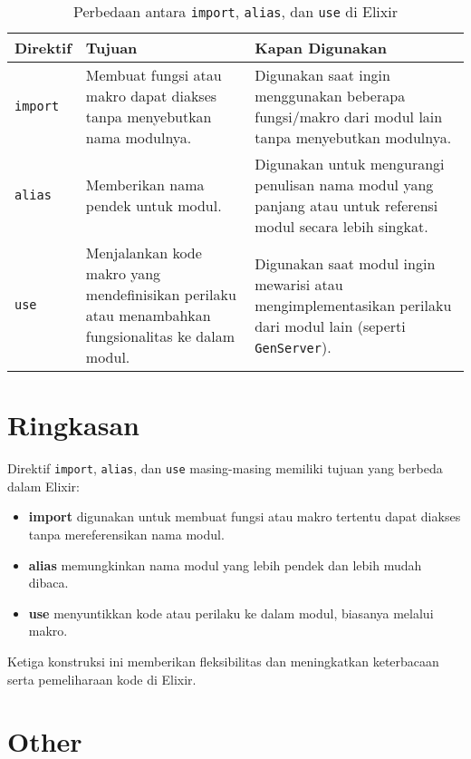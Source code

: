 \begin{table}[h!]
	\centering
	\begin{tabular}{|p{.1\linewidth}|p{.4\linewidth}|p{.4\linewidth}|}
		\hline
		\textbf{Direktif} & \textbf{Tujuan} & \textbf{Kapan Digunakan} \\ \hline
		\texttt{import} & Membuat fungsi atau makro dapat diakses tanpa menyebutkan nama modulnya. & Digunakan saat ingin menggunakan beberapa fungsi/makro dari modul lain tanpa menyebutkan modulnya. \\ \hline
		\texttt{alias} & Memberikan nama pendek untuk modul. & Digunakan untuk mengurangi penulisan nama modul yang panjang atau untuk referensi modul secara lebih singkat. \\ \hline
		\texttt{use} & Menjalankan kode makro yang mendefinisikan perilaku atau menambahkan fungsionalitas ke dalam modul. & Digunakan saat modul ingin mewarisi atau mengimplementasikan perilaku dari modul lain (seperti \texttt{GenServer}). \\ \hline
	\end{tabular}
	\caption{Perbedaan antara \texttt{import}, \texttt{alias}, dan \texttt{use} di Elixir}
\end{table}

\section{Ringkasan}
Direktif \texttt{import}, \texttt{alias}, dan \texttt{use} masing-masing memiliki tujuan yang berbeda dalam Elixir:

\begin{itemize}
	\item \textbf{import} digunakan untuk membuat fungsi atau makro tertentu dapat diakses tanpa mereferensikan nama modul.
	\item \textbf{alias} memungkinkan nama modul yang lebih pendek dan lebih mudah dibaca.
	\item \textbf{use} menyuntikkan kode atau perilaku ke dalam modul, biasanya melalui makro.
\end{itemize}

Ketiga konstruksi ini memberikan fleksibilitas dan meningkatkan keterbacaan serta pemeliharaan kode di Elixir.



\section{Other}


